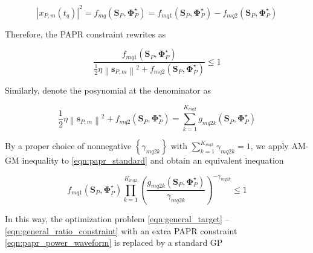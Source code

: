 \begin{equation}\label{eqn:papr_signomial}
  {\left| {{x_{P,m}}\left( {{t_q}} \right)} \right|^2} = {f_{mq}}\left( {{{\mathbf{S}}_P},{\mathbf{\Phi }}_P^ \star } \right) = {f_{mq1}}\left( {{{\mathbf{S}}_P},{\mathbf{\Phi }}_P^ \star } \right) - {f_{mq2}}\left( {{{\mathbf{S}}_P},{\mathbf{\Phi }}_P^ \star } \right)
\end{equation}

Therefore, the PAPR constraint rewrites as

\begin{equation}\label{eqn:papr_standard}
  \frac{{{f_{mq1}}\left( {{{\mathbf{S}}_P},{\mathbf{\Phi }}_P^ \star } \right)}}{{\frac{1}{2}\eta {{\left\| {{{\mathbf{s}}_{P,m}}} \right\|}^2} + {f_{mq2}}\left( {{{\mathbf{S}}_P},{\mathbf{\Phi }}_P^ \star } \right)}} \leqslant 1
\end{equation}

Similarly, denote the posynomial at the denominator as 

\begin{equation}\label{eqn:papr_denominator}
  \frac{1}{2}\eta {\left\| {{{\mathbf{s}}_{P,m}}} \right\|^2} + {f_{mq2}}\left( {{{\mathbf{S}}_P},{\mathbf{\Phi }}_P^ \star } \right) = \sum\limits_{k = 1}^{{K_{mq2}}} {{g_{mq2k}}} \left( {{{\mathbf{S}}_P},{\mathbf{\Phi }}_P^ \star } \right)
\end{equation}

By a proper choice of nonnegative $\left\{ {{\gamma _{mq2k}}} \right\}$ with $\sum\nolimits_{k = 1}^{{K_{mq2}}} {{\gamma _{mq2k}}}  = 1$, we apply AM-GM inequality to \ref{eqn:papr_standard} and obtain an equivalent inequation

\begin{equation}\label{eqn:papr_equivalent_inequality}
  {f_{mq1}}\left( {{{\mathbf{S}}_P},{\mathbf{\Phi }}_P^ \star } \right)\prod\limits_{k = 1}^{{K_{mq2}}} {{{\left( {\frac{{{g_{mq2k}}\left( {{{\mathbf{S}}_P},{\mathbf{\Phi }}_P^ \star } \right)}}{{{\gamma _{mq2k}}}}} \right)}^{ - {\gamma _{mq2k}}}}}  \leqslant 1
\end{equation} 

In this way, the optimization problem \ref{eqn:general_target} -- \ref{eqn:general_ratio_constraint} with an extra PAPR constraint \ref{eqn:papr_power_waveform} is replaced by a standard GP 

